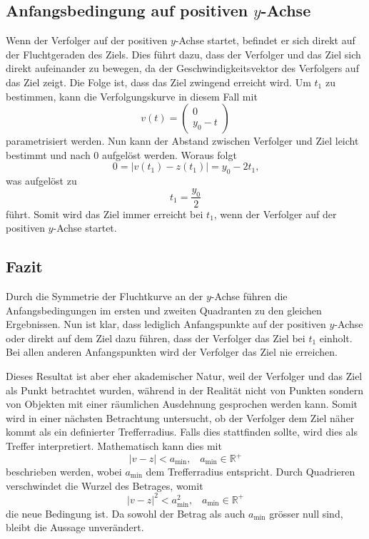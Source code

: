 \subsection{Anfangsbedingung auf positiven $y$-Achse}
Wenn der Verfolger auf der positiven $y$-Achse startet, befindet er sich direkt auf der Fluchtgeraden des Ziels.
Dies führt dazu, dass der Verfolger und das Ziel sich direkt aufeinander zu bewegen, da der Geschwindigkeitsvektor des Verfolgers auf das Ziel zeigt.
Die Folge ist, dass das Ziel zwingend erreicht wird.
Um $t_1$ zu bestimmen, kann die Verfolgungskurve in diesem Fall mit
%
\begin{equation}
    v(t)
    =
    \begin{pmatrix} 0 \\ y_0-t \end{pmatrix}
\end{equation}
%
parametrisiert werden.
Nun kann der Abstand zwischen Verfolger und Ziel leicht bestimmt und nach 0 aufgelöst werden.
Woraus folgt
%
\begin{equation}
    0
    =
    |v(t_1)-z(t_1)|
    =
    y_0-2t_1\text{,}
\end{equation}
%
was aufgelöst zu
%
\begin{equation}
    t_1
    =
    \frac{y_0}{2}
\end{equation}
%
führt.
Somit wird das Ziel immer erreicht bei $t_1$, wenn der Verfolger auf der positiven $y$-Achse startet.
\subsection{Fazit}
Durch die Symmetrie der Fluchtkurve an der $y$-Achse führen die Anfangsbedingungen im ersten und zweiten Quadranten zu den gleichen Ergebnissen. Nun ist klar, dass lediglich Anfangspunkte auf der positiven $y$-Achse oder direkt auf dem Ziel dazu führen, dass der Verfolger das Ziel bei $t_1$ einholt.
Bei allen anderen Anfangspunkten wird der Verfolger das Ziel nie erreichen.

Dieses Resultat ist aber eher akademischer Natur, weil der Verfolger und das Ziel als Punkt betrachtet wurden, während in der Realität nicht von Punkten sondern von Objekten mit einer räumlichen Ausdehnung gesprochen werden kann.
Somit wird in einer nächsten Betrachtung untersucht, ob der Verfolger dem Ziel näher kommt als ein definierter Trefferradius.
Falls dies stattfinden sollte, wird dies als Treffer interpretiert.
Mathematisch kann dies mit
%
\begin{equation}
    |v-z|<a_{\text{min}} \text{,}\quad a_{\text{min}}\in\mathbb{R}^+
\end{equation}
%
beschrieben werden, wobei $a_{\text{min}}$ dem Trefferradius entspricht.
Durch Quadrieren verschwindet die Wurzel des Betrages, womit
%
\begin{equation}
    |v-z|^2<a_{\text{min}}^2 \text{,}\quad a_{\text{min}}\in \mathbb{R}^+
    \label{lambertw:minimumAbstand}
\end{equation}
%
die neue Bedingung ist.
Da sowohl der Betrag als auch $a_{\text{min}}$ grösser null sind, bleibt die Aussage unverändert.
%
